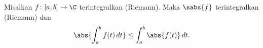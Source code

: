 
\begin{prop} \label{prop:inttriangleineq}
Misalkan $f \colon [a,b] \to \C$ terintegralkan (Riemann).
Maka $\sabs{f}$ terintegralkan (Riemann) dan
\begin{equation*}
\abs{\int_a^b f(t) \, dt} \leq 
\int_a^b \abs{f(t)} \, dt .
\end{equation*}
\end{prop}
